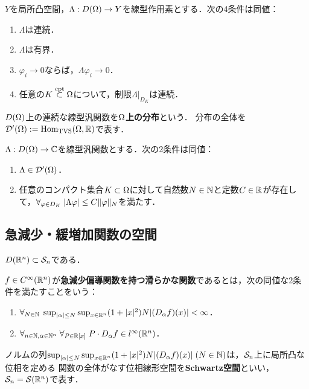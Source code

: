 \documentclass[uplatex,dvipdfmx]{jsreport}
\begin{document}
\begin{theorem}[試験関数の空間上の線形作用素の連続性の特徴付け]
    $Y$を局所凸空間，$\Lambda:D(\Om)\to Y$を線型作用素とする．次の4条件は同値：
    \begin{enumerate}
        \item $\Lambda$は連続．
        \item $\Lambda$は有界．
        \item $\varphi_i\to0$ならば，$\Lambda\varphi_i\to0$．
        \item 任意の$K\compsub\Om$について，制限$\Lambda|_{D_K}$は連続．
    \end{enumerate}
\end{theorem}

\begin{definition}[distribution]
    $D(\Om)$上の連続な線型汎関数を\textbf{$\Om$上の分布}という．
    分布の全体を$\D'(\Om):=\Hom_\TVS(\Om,\R)$で表す．
\end{definition}

\begin{theorem}[連続性の特徴付け]
    $\Lambda:D(\Om)\to\C$を線型汎関数とする．次の2条件は同値：
    \begin{enumerate}
        \item $\Lambda\in\D'(\Om)$．
        \item 任意のコンパクト集合$K\subset\Om$に対して自然数$N\in\N$と定数$C\in\R$が存在して，$\forall_{\varphi\in D_K}\;\abs{\Lambda\varphi}\le C\norm{\varphi}_N$を満たす．
    \end{enumerate}
\end{theorem}

\subsection{急減少・緩増加関数の空間}

\begin{tcolorbox}[colframe=ForestGreen, colback=ForestGreen!10!white,breakable,colbacktitle=ForestGreen!40!white,coltitle=black,fonttitle=\bfseries\sffamily,
title=]
    $D(\R^n)\subset\S_n$である．
\end{tcolorbox}

\begin{definition}
    $f\in C^\infty(\R^n)$が\textbf{急減少偏導関数を持つ滑らかな関数}であるとは，次の同値な2条件を満たすことをいう：
    \begin{enumerate}
        \item $\forall_{N\in\N}\;\sup_{\abs{\al}\le N}\sup_{x\in\R^n}(1+\abs{x}^2)N\abs{(D_\al f)(x)}<\infty$．
        \item $\forall_{n\in\N,\al\in\N^n}\;\forall_{P\in\R[x]}\;P\cdot D_\al f\in l^\infty(\R^n)$．
    \end{enumerate}
    ノルムの列$\sup_{\abs{\al}\le N}\sup_{x\in\R^n}(1+\abs{x}^2)N\abs{(D_\al f)(x)}\;(N\in\N)$は，$\S_n$上に局所凸な位相を定める
    関数の全体がなす位相線形空間を\textbf{Schwartz空間}といい，$\S_n=\S(\R^n)$で表す．
\end{definition}
\end{document}
